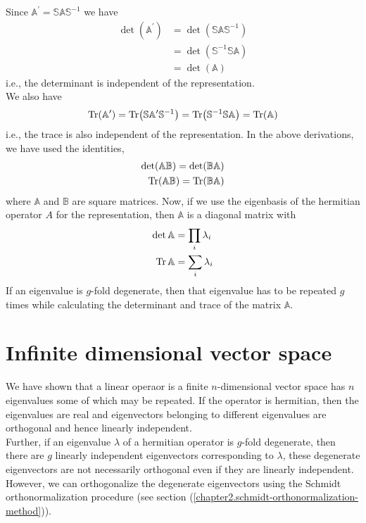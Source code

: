 	Since $\mathbb{A}^\prime = \mathbb{S} \mathbb{A} \mathbb{S}^{-1}$ we have 
	\begin{eqnarray}
		\det(\mathbb{A}^\prime) 
		&= \det(\mathbb{S} \mathbb{A} \mathbb{S}^{-1}) \nonumber \\
		&= \det(\mathbb{S}^{-1}\mathbb{S} \mathbb{A} ) \nonumber \\
		&= \det(\mathbb{A})
	\end{eqnarray}
	i.e., the determinant is independent of the representation.\\
	
	We also have
	\begin{equation}
		\Tr (\mathbb{A}^\prime) = \Tr (\mathbb{S}\mathbb{A}^\prime\mathbb{S}^{-1})=\Tr(\mathbb{S}^{-1}\mathbb{S} \mathbb{A}) = \Tr (\mathbb{A})
	\end{equation}
	i.e., the trace is also independent of the representation. In the above derivations, we have used the identities,
	\begin{eqnarray}
		\det( \mathbb{A}\mathbb{B}) = \det(\mathbb{B}\mathbb{A}) \\
		\Tr( \mathbb{A}\mathbb{B}) = \Tr(\mathbb{B}\mathbb{A})
	\end{eqnarray}
	where $\mathbb{A}$ and $\mathbb{B}$ are square matrices. Now, if we use the eigenbasis of the hermitian operator $A$ for the representation, then $\mathbb{A}$ is a diagonal matrix with
	\begin{eqnarray}
		\det \mathbb{A} &= \prod_i \lambda_i \\
		\Tr \mathbb{A} &= \sum_i \lambda_i 
	\end{eqnarray}
	If an eigenvalue is $g$-fold degenerate, then that eigenvalue has to be repeated $g$ times while calculating the determinant and trace of the matrix $\mathbb{A}$.\\
	
	
	
	\section{Infinite dimensional vector space}
	We have shown that a linear operaor is a finite $n$-dimensional vector space has $n$ eigenvalues some of which may be repeated. If the operator is hermitian, then the eigenvalues are real and eigenvectors belonging to different eigenvalues are orthogonal and hence linearly independent.\\
	
	Further, if an eigenvalue $\lambda$ of a hermitian operator is $g$-fold degenerate, then there are $g$ linearly independent eigenvectors corresponding to $\lambda$, these degenerate eigenvectors are not necessarily orthogonal even if they are linearly independent. However, we can orthogonalize the degenerate eigenvectors using the Schmidt orthonormalization procedure (see section (\ref{chapter2.schmidt-orthonormalization-method})). \\
	
